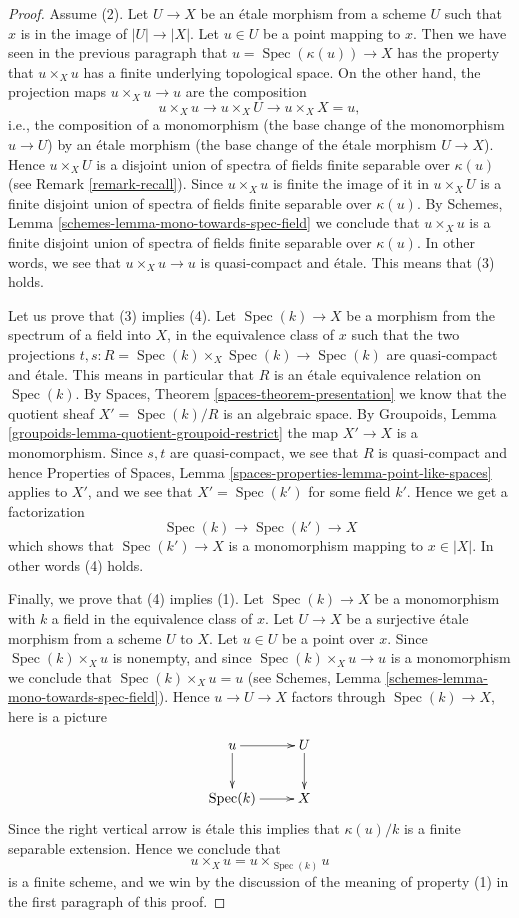 \documentclass{stacks-project}
\theoremstyle{plain}
\theoremstyle{definition}
\theoremstyle{remark}
\numberwithin{equation}{subsection}
\def\Spec{\mathop{\mathrm{Spec}}}
\begin{document}
\begin{proof}
\medskip\noindent
Assume (2). Let $U \to X$ be an \'etale morphism from a scheme $U$
such that $x$ is in the image of $|U| \to |X|$. Let $u \in U$ be
a point mapping to $x$. Then we have seen in the previous
paragraph that $u = \Spec(\kappa(u)) \to X$ has the property that
$u \times_X u$ has a finite underlying topological space. On the other
hand, the projection maps $u \times_X u \to u$ are the composition
$$
u \times_X u \longrightarrow
u \times_X U \longrightarrow
u \times_X X = u,
$$
i.e., the composition of a monomorphism (the base change of the monomorphism
$u \to U$) by an \'etale morphism (the base change of the \'etale morphism
$U \to X$). Hence $u \times_X U$ is a disjoint union of spectra of fields
finite separable over $\kappa(u)$ (see
Remark \ref{remark-recall}). Since $u \times_X u$ is finite the image
of it in $u \times_X U$ is a finite disjoint union of spectra of fields
finite separable over $\kappa(u)$. By
Schemes, Lemma \ref{schemes-lemma-mono-towards-spec-field}
we conclude that $u \times_X u$ is a finite disjoint union of spectra
of fields finite separable over $\kappa(u)$. In other words, we see that
$u \times_X u \to u$ is quasi-compact and \'etale. This means that (3) holds.

\medskip\noindent
Let us prove that (3) implies (4). Let $\Spec(k) \to X$ be a morphism
from the spectrum of a field into $X$, in the equivalence class of $x$
such that the two projections
$t, s : R = \Spec(k) \times_X \Spec(k)  \to \Spec(k)$
are quasi-compact and \'etale.
This means in particular
that $R$ is an \'etale equivalence relation on $\Spec(k)$.
By Spaces, Theorem \ref{spaces-theorem-presentation}
we know that the quotient sheaf
$X' = \Spec(k)/R$ is an algebraic space. By
Groupoids, Lemma \ref{groupoids-lemma-quotient-groupoid-restrict}
the map $X' \to X$ is a monomorphism.
Since $s, t$ are quasi-compact, we see that $R$ is quasi-compact and hence
Properties of Spaces,
Lemma \ref{spaces-properties-lemma-point-like-spaces}
applies to $X'$, and we see that
$X' = \Spec(k')$ for some field $k'$. Hence we get a factorization
$$
\Spec(k) \longrightarrow
\Spec(k') \longrightarrow X
$$
which shows that $\Spec(k') \to X$ is a monomorphism mapping
to $x \in |X|$. In other words (4) holds.

\medskip\noindent
Finally, we prove that (4) implies (1). Let $\Spec(k) \to X$
be a monomorphism with $k$ a field in the equivalence class of $x$.
Let $U \to X$ be a surjective \'etale morphism from a scheme $U$ to $X$.
Let $u \in U$ be a point over $x$. Since $\Spec(k) \times_X u$
is nonempty, and since $\Spec(k) \times_X u \to u$ is a monomorphism
we conclude that $\Spec(k) \times_X u = u$ (see
Schemes, Lemma \ref{schemes-lemma-mono-towards-spec-field}).
Hence $u \to U \to X$ factors through $\Spec(k) \to X$, here is
a picture
$$
\xymatrix{
u \ar[r] \ar[d] & U \ar[d] \\
\Spec(k) \ar[r] & X
}
$$
Since the right vertical arrow is \'etale this implies that
$\kappa(u)/k$ is a finite separable extension. Hence we conclude that
$$
u \times_X u = u \times_{\Spec(k)} u
$$
is a finite scheme, and we win by the discussion of the meaning of property
(1) in the first paragraph of this proof.
\end{proof}
\end{document}
